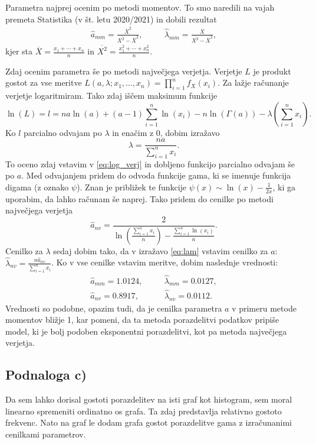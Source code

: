 \documentclass[12pt, a4paper]{article}
\begin{document}
Parametra najprej ocenim po metodi momentov. To smo naredili na vajah premeta Statistika (v št. letu 2020/2021) in dobili rezultat
\begin{align*}
\widehat{a}_{mm} = \frac{\overline{X}^2}{\overline{X^2} - \overline{X}^2}, & \quad &
\widehat{\lambda}_{mm} = \frac{\overline{X}}{\overline{X^2} - \overline{X}^2},
\end{align*}
kjer sta $\overline{X} = \frac{x_1 + \cdots + x_n}{n}$ in $\overline{X^2} = \frac{x_1^2 + \cdots + x_n^2}{n}$.

Zdaj ocenim parametra še po metodi največjega verjetja. Verjetje $L$ je produkt gostot za vse meritve $L(a, \lambda ; x_1, \ldots, x_n) = \prod_{i = 1}^n f_X(x_i)$. Za lažje računanje verjetje logaritmiram. Tako zdaj iščem maksimum funkcije
\begin{equation}
\label{eq:log_verj}
\ln(L) = l = na\ln(a) + (a-1)\sum_{i=1}^n\ln(x_i) - n\ln(\Gamma(a)) - \lambda(\sum_{i=1}^n x_i).
\end{equation}
Ko $l$ parcialno odvajam po $\lambda$ in enačim z $0$, dobim izražavo
\begin{equation}
\label{eq:lam}
\lambda = \frac{na}{\sum_{i=1}^n x_i}.
\end{equation}
To oceno zdaj vstavim v \eqref{eq:log_verj} in dobljeno funkcijo parcialno odvajam še po $a$. Med odvajanjem pridem do odvoda funkcije gama, ki se imenuje funkcija digama (z oznako $\psi$). Znan je približek te funkcije $\psi(x) \sim \ln (x) - \frac{1}{2x}$, ki ga uporabim, da lahko računam še naprej. Tako pridem do cenilke po metodi največjega verjetja
\[
\widehat{a}_{nv} = \frac{2}{\ln(\frac{\sum_{i=1}^n x_i}{n}) - \frac{\sum_{i=1}^n \ln(x_i)}{n}}.
\]
Cenilko za $\lambda$ sedaj dobim tako, da v izražavo \eqref{eq:lam} vstavim cenilko za $a$: $\widehat{\lambda}_{nv} = \frac{n \widehat{a}_{nv}}{\sum_{i=1}^n x_i}$.
Ko v vse cenilke vstavim meritve, dobim naslednje vrednosti:
\begin{align*}
\widehat{a}_{mm} = 1.0124, & \quad & \widehat{\lambda}_{mm} =  0.0127, \\
\widehat{a}_{nv} =  0.8917, & \quad & \widehat{\lambda}_{nv} =  0.0112.
\end{align*}
Vrednosti so podobne, opazim tudi, da je cenilka parametra $a$ v primeru metode momentov bližje 1, kar pomeni, da ta metoda porazdelitvi podatkov pripiše model, ki je bolj podoben eksponentni porazdelitvi, kot pa metoda največjega verjetja.

\newpage
\subsection*{Podnaloga c)}
Da sem lahko dorisal gostoti porazdelitev na isti graf kot histogram, sem moral linearno spremeniti ordinatno os grafa. Ta zdaj predstavlja relativno gostoto frekvenc. Nato na graf le dodam grafa gostot porazdelitve gama z izračunanimi cenilkami parametrov.
\end{document}
